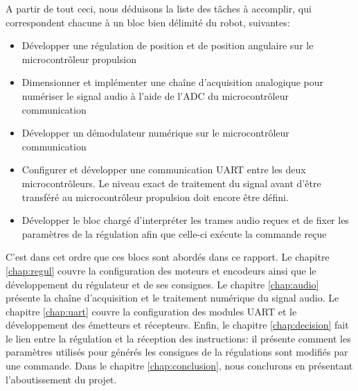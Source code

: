 A partir de tout ceci, nous déduisons la liste des tâches à accomplir, qui correspondent chacune à un bloc bien délimité du robot, suivantes:
\begin{itemize}
  \item Développer une régulation de position et de position angulaire sur le microcontrôleur propulsion
  \item Dimensionner et implémenter une chaîne d'acquisition analogique pour numériser le signal audio à l'aide de l'ADC du microcontrôleur communication
  \item Développer un démodulateur numérique sur le microcontrôleur communication
  \item Configurer et développer une communication UART entre les deux microcontrôleurs. Le niveau exact de traitement du signal avant d'être transféré au microcontrôleur propulsion doit encore être défini.
  \item Développer le bloc chargé d'interpréter les trames audio reçues et de fixer les paramètres de la régulation afin que celle-ci exécute la commande reçue
\end{itemize}

C'est dans cet ordre que ces blocs sont abordés dans ce rapport. Le chapitre \ref{chap:regul} couvre la configuration des moteurs et encodeurs ainsi que le développement du régulateur et de ses consignes. Le chapitre \ref{chap:audio} présente la chaîne d'acquisition et le traitement numérique du signal audio. Le chapitre \ref{chap:uart} couvre la configuration des modules UART et le développement des émetteurs et récepteurs. Enfin, le chapitre \ref{chap:decision} fait le lien entre la régulation et la réception des instructions: il présente comment les paramètres utilisés pour générés les consignes de la régulations sont modifiés par une commande. Dans le chapitre \ref{chap:conclusion}, nous conclurons en présentant l'aboutissement du projet.